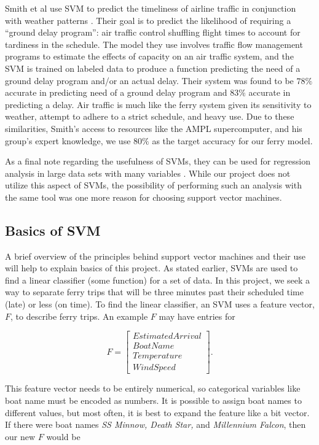 \documentclass[11pt]{article} %
\begin{document}
Smith et al use SVM to predict the timeliness of airline
traffic in conjunction with weather patterns \cite{smith2008decision}. Their goal is 
to predict the likelihood of requiring a ``ground delay program'': air traffic
control shuffling flight times
to account for tardiness in the schedule. The model they use involves traffic 
flow management programs to estimate the effects of capacity on an air traffic 
system, and the SVM is trained on labeled data to produce a function predicting 
the need of a ground delay program and/or an actual delay. Their system was
found to be $78\%$ accurate in predicting need of a ground delay program and $83\%$ 
accurate in predicting a delay. Air traffic is much like the ferry system given
its sensitivity to weather, attempt to adhere to a strict schedule, and heavy use.
Due to these similarities, Smith's access to resources like the AMPL supercomputer, 
and his group's expert knowledge, we use $80\%$ as the target accuracy for our
ferry model. 

As a final note regarding the usefulness of SVMs, they can be used for regression 
analysis in large
data sets with many variables \cite{chang2011libsvm}. While our project does not
utilize this aspect of SVMs, the possibility of performing such an analysis with the
same tool was one more reason for choosing support vector machines.


\subsection{Basics of SVM}
\label{sec:basics_svm}
A brief overview of the principles behind support vector machines and their use
will help to explain basics of this project. As stated earlier,
SVMs are used to find a linear classifier (some function) for a set of data.  In
this project, we seek a way to separate ferry trips that will be three minutes
past their scheduled time (late) or less (on time). To find the linear classifier,
an SVM uses a feature vector, $F$, to describe ferry trips.  An example $F$ may have
entries for

\[F=\begin{bmatrix}
        EstimatedArrival \\
        BoatName\\
        Temperature\\
        WindSpeed
\end{bmatrix}.\]

This feature vector needs to be entirely numerical, so categorical variables like
boat name must be encoded as numbers.  It is possible to assign boat names to
different values, but most often, it is best to expand the feature like a bit
vector.  If there were boat names \textit{SS Minnow, Death Star,} and 
\textit{Millennium Falcon}, then our new $F$ would be
\end{document}
